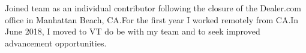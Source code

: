 \begin{cvparagraph}
Joined team as an individual contributor following the closure of the
Dealer.com office in Manhattan Beach, CA.\@ For the first year I worked
remotely from CA.\@ In June 2018, I moved to VT do be with my team and
to seek improved advancement opportunities.
\end{cvparagraph}

\vspace{-1.00mm}


